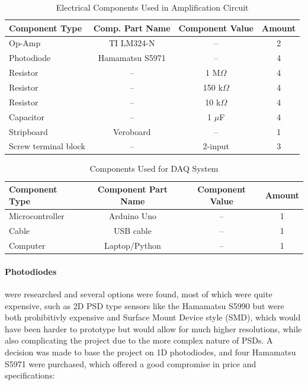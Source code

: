 \begin{table}[htbp]
  \centering
  \begin{threeparttable}
    \caption{Electrical Components Used in Amplification Circuit}
    \label{tab:components_list_stripboard}
    \begin{tabular}{lccc}  
      \toprule
      \textbf{Component Type} & \textbf{Comp. Part Name} & \textbf{Component Value} & \textbf{Amount} \\
      \midrule
      Op-Amp & TI LM324-N & -- & 2 \\
      Photodiode & Hamamatsu S5971 & -- & 4 \\
      Resistor & -- & 1 M$\Omega$ & 4 \\
      Resistor & -- & 150 k$\Omega$ & 4 \\
      Resistor & -- & 10 k$\Omega$ & 4 \\
      Capacitor & -- & 1 $\mu$F & 4 \\
      Stripboard & Veroboard & -- & 1 \\
      Screw terminal block & -- & 2-input & 3 \\
      \bottomrule
    \end{tabular}
    
  \end{threeparttable}
\end{table}

\begin{table}[htbp]
  \centering
  \begin{threeparttable}
    \caption{Components Used for DAQ System}
    \label{tab:daq_components}
    
    \begin{tabular}{lccc}  
      \toprule
      \textbf{Component Type} & \textbf{Component Part Name} & \textbf{Component Value} & \textbf{Amount} \\
      \midrule
      Microcontroller & Arduino Uno & -- & 1 \\
      Cable & USB cable & -- & 1 \\
      Computer & Laptop/Python & -- & 1 \\
      \bottomrule
    \end{tabular}
    
  \end{threeparttable}
\end{table}

\paragraph{Photodiodes} were researched and several options were found, most of which were quite expensive, such as 2D PSD type sensors like the Hamamatsu S5990 but were both prohibitivly expensive and Surface Mount Device style (SMD), which would have been harder to prototype but would allow for much higher resolutions, while also complicating the project due to the more complex nature of PSDs. A decision was made to base the project on 1D photodiodes, and four Hamamatsu S5971 were purchased, which offered a good compromise in price and specifications: 

